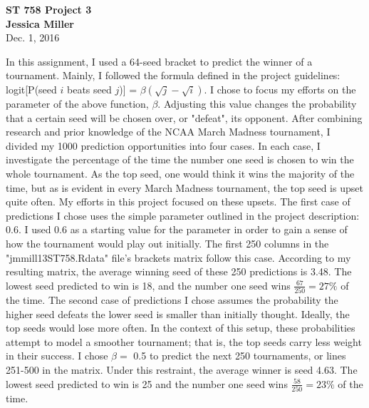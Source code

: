 \documentclass[11pt]{article}
\begin{document}
\begin{center}
	{\Large {\bf ST 758 Project 3}}\\ \vspace{12pt}
	{\large {\bf Jessica Miller}}\\ \vspace{12pt}
	Dec. 1, 2016
	\vspace{5mm}
	\vspace{5mm}
\end{center}

\begin{flushleft}
	In this assignment, I used a 64-seed bracket to predict the winner of a tournament. Mainly, I followed the formula defined in the project guidelines: logit[P(seed \(i\) beats seed \(j\))] = \(\beta(\sqrt{j} - \sqrt{i})\).
	\newline
	\newline
	I chose to focus my efforts on the parameter of the above function, \(\beta\). Adjusting this value changes the probability that a certain seed will be chosen over, or "defeat", its opponent. After combining research and prior knowledge of the NCAA March Madness tournament, I divided my 1000 prediction opportunities into four cases. In each case, I investigate the percentage of the time the number one seed is chosen to win the whole tournament. As the top seed, one would think it wins the majority of the time, but as is evident in every March Madness tournament, the top seed is upset quite often. My efforts in this project focused on these upsets.
	\newline
	\newline
	The first case of predictions I chose uses the simple parameter outlined in the project description: 0.6. I used 0.6 as a starting value for the parameter in order to gain a sense of how the tournament would play out initially. The first 250 columns in the "jmmill13ST758.Rdata" file's brackets matrix follow this case. According to my resulting matrix, the average winning seed of these 250 predictions is 3.48. The lowest seed predicted to win is 18, and the number one seed wins \(\frac{67}{250} = 27\%\) of the time. 
	\newline
	\newline
	The second case of predictions I chose assumes the probability the higher seed defeats the lower seed is smaller than initially thought. Ideally, the top seeds would lose more often. In the context of this setup, these probabilities attempt to model a smoother tournament; that is, the top seeds carry less weight in their success. I chose \(\beta =\) 0.5 to predict the next 250 tournaments, or lines 251-500 in the matrix. Under this restraint, the average winner is seed 4.63. The lowest seed predicted to win is 25 and the number one seed wins \(\frac{58}{250} = 23\%\) of the time.

\end{flushleft}
\end{document}
